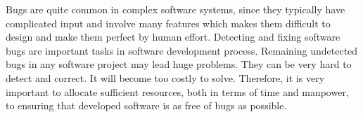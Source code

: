 {Bugs are quite common  in complex software systems,
since they typically have complicated input and involve many features which makes them difficult to design and make them perfect by human effort.}
%
Detecting and fixing software bugs are important tasks in software development process. Remaining undetected bugs in any software project may lead huge
problems. They can be very hard to detect and correct. It will
become too costly to solve.
Therefore, it is very important to allocate sufficient
resources, both in terms of time and manpower, to ensuring that developed
software is as free of bugs as possible.

%
%
%

